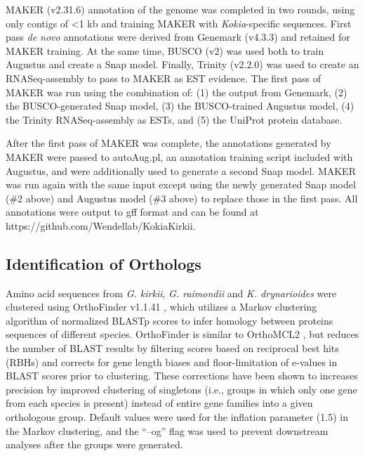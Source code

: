 \documentclass[10pt,letterpaper]{article}
\newcommand{\note}[2][]{\added[id=#1,remark={#2}]{}}
\begin{document}
MAKER (v2.31.6)\cite{Holt2011} annotation of the genome was completed in two
rounds, using only contigs of \textless 1 kb and training MAKER with
\textit{Kokia}-specific sequences. First pass \textit{de novo} annotations were derived from
Genemark (v4.3.3)\cite{Lomsadze2005} and retained for MAKER training. At the
same time, BUSCO (v2)\cite{Simao2015} was used both to train Augustus and create
a Snap model\note[Corrinne]{WHAT'S A SNAP MODEL}. Finally, Trinity
\note[Corrinne]{WHY TRINITY VS MEGAHIT} (v2.2.0)\cite{Grabherr2011} was used to
create an RNASeq-assembly to pass to MAKER as EST evidence. The first pass of
MAKER was run using the combination of: (1) the output from Genemark, (2) the
BUSCO-generated Snap model, (3) the BUSCO-trained Augustus\cite{Stanke2003}
model, (4) the Trinity RNASeq-assembly as ESTs, and (5) the UniProt protein
database.

After the first pass of MAKER was complete, the annotations generated by MAKER
were passed to autoAug.pl, an annotation training script included with Augustus,
and were additionally used to generate a second Snap model. MAKER was run again
with the same input except using the newly generated Snap model (\#2 above) and
Augustus model (\#3 above) to replace those in the first pass. All annotations
were output to gff format and can be found at
https://github.com/Wendellab/KokiaKirkii.

\subsection*{Identification of Orthologs}

Amino acid sequences from \textit{G. kirkii}, \textit{G. raimondii} and \textit{K. drynarioides} were
clustered using OrthoFinder v1.1.41 \cite{Emms2015}, which utilizes a Markov
clustering algorithm of normalized BLASTp scores to infer homology between
proteins sequences of different species. OrthoFinder is similar to OrthoMCL2
\cite{Li2003}, but reduces the number of BLAST results by filtering scores based
on reciprocal best hits (RBHs) and corrects for gene length biases and
floor-limitation of e-values in BLAST scores prior to clustering. These
corrections have been shown to increases precision by improved clustering of
singletons (i.e., groups in which only one gene from each species is present)
instead of entire gene families into a given orthologous group. Default values
were used for the inflation parameter (1.5) in the Markov clustering, and the
“–og” flag was used to prevent downstream analyses after the groups were
generated.
\end{document}
